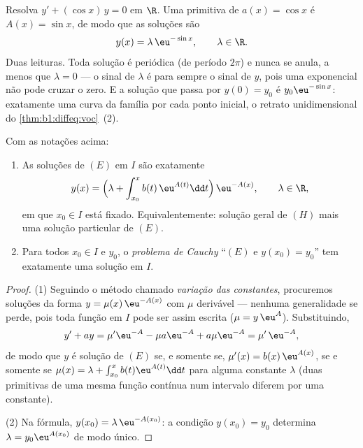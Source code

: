 \begin{example}\label{ex:b1:diffeq:varcoeff}
Resolva $y' + (\cos x)\,y = 0$ em $\R$. Uma primitiva de $a(x) =
\cos x$ é $A(x) = \sin x$, de modo que as soluções são
\[
y(x) = \lambda\,\eu^{-\sin x}, \qquad \lambda \in \R .
\]
Duas leituras. Toda solução é periódica (de período $2\pi$) e nunca
se anula, a menos que $\lambda = 0$ --- o sinal de $\lambda$ é para
sempre o sinal de $y$, pois uma exponencial não pode cruzar o zero. E
a solução que passa por $y(0) = y_0$ é $y_0\eu^{-\sin x}$: exatamente
uma curva da família por cada ponto inicial, o retrato
unidimensional do \cref{thm:b1:diffeq:voc}~(2).
\end{example}

\begin{theorem}\label{thm:b1:diffeq:voc}
Com as notações acima:
\begin{enumerate}
  \item As soluções de $(E)$ em $I$ são exatamente
        \[
        y(x) = \Bigl(\lambda + \int_{x_0}^{x} b(t)\, \eu^{A(t)} \dd t
        \Bigr)\, \eu^{-A(x)},
        \qquad \lambda \in \R,
        \]
        em que $x_0 \in I$ está fixado. Equivalentemente: solução geral de
        $(H)$ mais uma solução particular de $(E)$.
  \item Para todos $x_0 \in I$ e $y_0$, o \emph{problema de
        Cauchy} ``$(E)$ e $y(x_0) = y_0$''
        tem exatamente uma solução em $I$.
\end{enumerate}
\end{theorem}

\begin{proof}
(1) Seguindo o método chamado \emph{variação das
constantes}, procuremos soluções da
forma $y = \mu(x)\, \eu^{-A(x)}$ com $\mu$ derivável --- nenhuma
generalidade se perde, pois toda função em $I$ pode ser assim escrita
($\mu = y\,\eu^{A}$). Substituindo,
\[
y' + ay = \mu' \eu^{-A} - \mu a \eu^{-A} + a\mu\eu^{-A}
= \mu'\, \eu^{-A},
\]
de modo que $y$ é solução de $(E)$ se, e somente se, $\mu'(x) = b(x)\,\eu^{A(x)}$, se
e somente se $\mu(x) = \lambda + \int_{x_0}^x b(t)\eu^{A(t)}\dd t$ para
alguma constante $\lambda$ (duas primitivas de uma mesma função
contínua num intervalo diferem por uma constante).

(2) Na fórmula, $y(x_0) = \lambda\,\eu^{-A(x_0)}$: a condição
$y(x_0) = y_0$ determina $\lambda = y_0 \eu^{A(x_0)}$ de modo único.
\end{proof}

